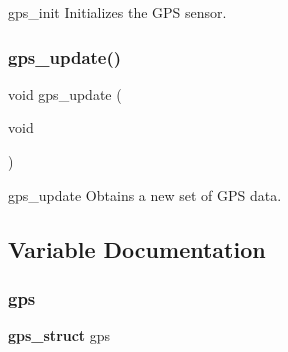 gps\+\_\+init Initializes the G\+PS sensor. \mbox{\label{gps_8h_a89ec0a415f4e2f9f100bc9b44daca279}} 
\subsubsection{gps\+\_\+update()}
{\footnotesize\ttfamily void gps\+\_\+update (\begin{DoxyParamCaption}\item[{void}]{ }\end{DoxyParamCaption})}

gps\+\_\+update Obtains a new set of G\+PS data. 

\subsection{Variable Documentation}
\mbox{\label{gps_8h_a3ac9e34d8b27112400d1b5f488f95924}} 
\subsubsection{gps}
{\footnotesize\ttfamily \textbf{ gps\+\_\+struct} gps}

